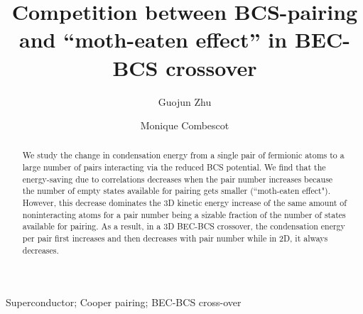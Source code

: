 \documentclass[5p,twocolumn]{elsarticle}
\begin{document}
\title{Competition between BCS-pairing and ``moth-eaten effect'' in BEC-BCS crossover}
\author[uiuc]{Guojun Zhu}
\author[uiuc,upmc]{Monique Combescot}
\address[uiuc]{Department of Physics, University of Illinois at Urbana-Champaign, 1110 W Green St, Urbana, IL, 61801}

\address[upmc]{Institut des NanoSciences de Paris, Universit\'{e} Pierre et Marie Curie, CNRS, Tour 22, 4 place Jussieu, 75005 Paris }
\newcommand{\vk}{\ensuremath{\mathbf{k}}}
\providecommand{\vr}{\ensuremath{\mathbf{r}}}
\newcommand{\vp}{\ensuremath{\mathbf{p}}}


\providecommand{\comm}[1]{\textit{\scriptsize \uwave{(#1)}}}
\newcommand{\td}{{\ensuremath{{\text{(2D)}}}}}
\newcommand{\sd}{{\ensuremath{{\text{(3D)}}}}}
\newcommand{\Arctg}{\ensuremath{\text{Arctg}}}



\begin{abstract}
We study the change in condensation energy from a single pair of fermionic atoms to a large number of pairs interacting via the reduced BCS potential. We find that the energy-saving due to correlations decreases when the pair number increases because the number of empty states available for pairing gets smaller (``moth-eaten effect"). However, this decrease  dominates the 3D kinetic energy increase of the same amount of noninteracting atoms for a  pair number being a sizable fraction of the number of states available for pairing. As a result, in a 3D BEC-BCS crossover, the condensation energy per pair first increases and then decreases with pair number while in 2D, it always decreases.  
\end{abstract}
\begin{keyword}
Superconductor; Cooper pairing; BEC-BCS cross-over
\end{keyword}

\maketitle
\end{document}
